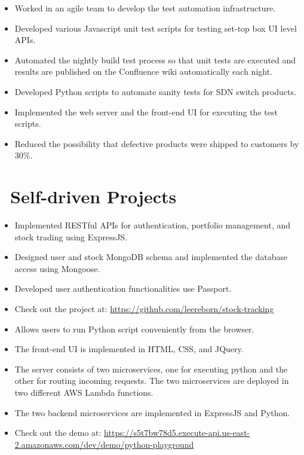 \documentclass{resume}
\begin{document}
\begin{itemize}
	\item Worked in an agile team to develop the test automation infrastructure.
	\item Developed various Javascript unit test scripts for testing set-top box UI level APIs.
	\item Automated the nightly build test process so that unit tests are executed and results are published on the Confluence wiki automatically each night.
\end{itemize}

\begin{itemize}
	\item Developed Python scripts to automate sanity tests for SDN switch products.
	\item Implemented the web server and the front-end UI for executing the test scripts. 
	\item Reduced the possibility that defective products were shipped to customers by 30\%.
\end{itemize}

\section{\faUsers\ Self-driven Projects}
\begin{itemize}
	\item Implemented RESTful APIs for authentication, portfolio management, and stock trading using ExpressJS.
	\item Designed user and stock MongoDB schema and implemented the database access using Mongoose.
	\item Developed user authentication functionalities use Passport.
	\item Check out the project at: \url{https://github.com/leereborn/stock-tracking}
\end{itemize}

\begin{itemize}
	\item Allows users to run Python script conveniently from the browser. 
	\item The front-end UI is implemented in HTML, CSS, and JQuery.
	\item The server consists of two microservices, one for executing python and the other for routing incoming requests. The two microservices are deployed in two different AWS Lambda functions.
	\item The two backend microservices are implemented in ExpressJS and Python.
	\item Check out the demo at: \url{https://s5t7bw78d5.execute-api.us-east-2.amazonaws.com/dev/demo/python-playground}  
\end{itemize}
\end{document}
